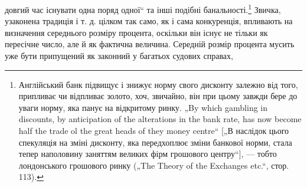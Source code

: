 довгий час існувати одна поряд одної“ та інші подібні банальності.\footnote{
Англійський банк підвищує і знижує норму свого дисконту залежно від
того, припливає чи відпливає золото, хоч, звичайно, він при цьому завжди бере
до уваги норму, яка панує на відкритому ринку. „By which gambling in discounts,
by anticipation of the alterations in the bank rate, has now become half the trade
ol the great heads of they money centre“ [„В наслідок цього спекуляція на зміні
дисконту, яка передхоплює зміни банкової норми, стала тепер наполовину
заняттям великих фірм грошового центру“], — тобто лондонського грошового
ринку („The Theory of the Exchanges etc.“, стор. 113).
}
Звичка, узаконена традиція і т. д. цілком так само, як
і сама конкуренція, впливають на визначення середнього розміру
процента, оскільки він існує не тільки як пересічне число,
але й як фактична величина. Середній розмір процента мусить
уже бути припущений як законний у багатьох судових справах,
\parbreak{}  %
